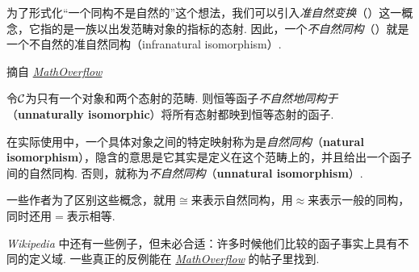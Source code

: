   为了形式化``一个同构不是自然的''这个想法，我们可以引入\emph{准自然变换}（）这一概念，它指的是一族以出发范畴对象的指标的态射.
  因此，一个\emph{不自然同构}（）就是一个不自然的准自然同构（infranatural isomorphism）.

  \begin{exam}
    摘自 \href{http://mathoverflow.net/a/139392/43771}{\emph{MathOverflow}}

    令${\cal C}$为只有一个对象和两个态射的范畴. 则恒等函子\emph{不自然地同构于}（\textbf{unnaturally isomorphic}）将所有态射都映到恒等态射的函子.
  \end{exam}

  在实际使用中，一个具体对象之间的特定映射称为是\emph{自然同构}（\textbf{natural isomorphism}），隐含的意思是它其实是定义在这个范畴上的，并且给出一个函子间的自然同构. 否则，就称为\emph{不自然同构}（\textbf{unnatural isomorphism}）.
  \begin{rem}
    一些作者为了区别这些概念，就用$\cong$来表示自然同构，用$\approx$来表示一般的同构，同时还用$=$表示相等.
  \end{rem}

  \emph{Wikipedia} 中还有一些例子，但未必合适：许多时候他们比较的函子事实上具有不同的定义域.
   一些真正的反例能在
   \href{http://mathoverflow.net/questions/139388/example-of-an-unnatural-isomorphism}{\emph{MathOverflow}}
   的帖子里找到.

